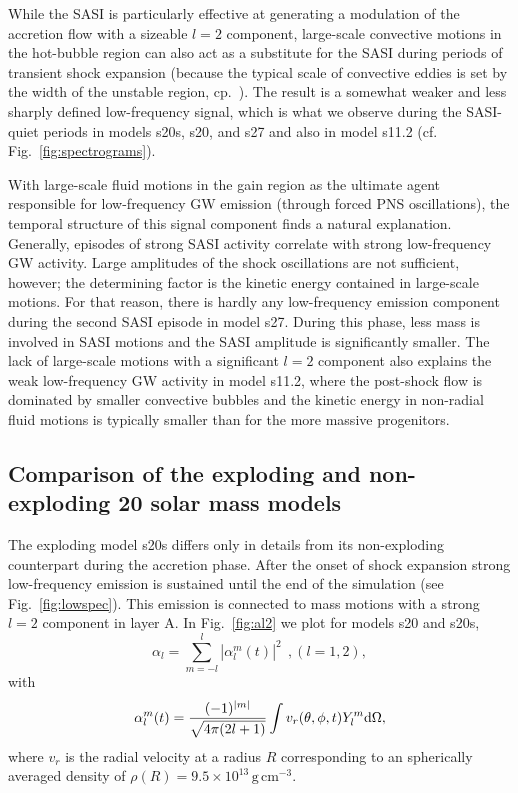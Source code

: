 While the SASI is particularly effective at generating
a modulation of the accretion flow with a sizeable $l=2$ component,
large-scale convective motions in the hot-bubble region can also act as a substitute
for the SASI during periods of transient shock expansion (because
the typical scale of convective eddies is set
by the width of the unstable region, cp.\ \citealp{chandrasekhar_61,foglizzo_06}). The result
is a somewhat weaker and less sharply defined low-frequency
signal, which is what we observe during the
SASI-quiet periods in models s20s, s20, and s27 and also in model s11.2 (cf. Fig.~\ref{fig:spectrograms}).

With large-scale fluid motions in the gain region as the ultimate
agent responsible for low-frequency GW emission (through forced PNS
oscillations), the temporal structure of this signal component finds a
natural explanation. Generally, episodes of strong SASI activity
correlate with strong low-frequency GW activity. Large amplitudes of
the shock oscillations are not sufficient, however; the determining
factor is the kinetic energy contained in large-scale motions.  For
that reason, there is hardly any low-frequency emission
component during the second SASI episode in model s27.
During this phase, less mass is involved in SASI motions and
the SASI amplitude is significantly smaller. The lack of large-scale
motions with a significant $l=2$ component also explains the weak
low-frequency GW activity in model s11.2, where the
post-shock flow is dominated by smaller convective bubbles and the
kinetic energy in non-radial fluid motions is typically smaller than
for the more massive progenitors.

\subsection{Comparison of the exploding and non-exploding 20 solar mass models}
The exploding model s20s differs only in details from its non-exploding
counterpart during the accretion phase. After the onset of shock expansion
strong low-frequency emission is sustained until the end of the simulation (see Fig.~\ref{fig:lowspec}).
This emission is connected to mass motions with a strong $l=2$ component in layer A.
In Fig.~\ref{fig:al2} we plot for models s20 and s20s,
\begin{equation}
\alpha_l = \sum_{m=-l}^{l}|\alpha_l^m(t)|^2 \ \ ,(l=1,2),
\end{equation} with
\begin{equation} \label{eq:alvr}
\alpha_l^m(t) = \frac{(-1)^{|m|}}{\sqrt{4\pi(2l+1)}} \int v_{r}(\theta,\phi,t) Y^m_l \mathrm{d} \Omega,
\end{equation}
where $v_{r}$ is the radial velocity at a radius $R$ corresponding to an spherically averaged density of 
$\rho(R) = 9.5 \times 10^{13}\, \mathrm{g}\, \mathrm{cm}^{-3}$.

